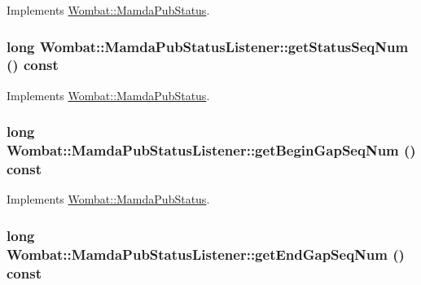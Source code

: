 Implements \hyperlink{classWombat_1_1MamdaPubStatus_553635179dab937c8ee88019f66ca0de}{Wombat::Mamda\-Pub\-Status}.\hypertarget{classWombat_1_1MamdaPubStatusListener_a3125f864d901d9d788778238c50c370}{
\subsubsection[getStatusSeqNum]{\setlength{\rightskip}{0pt plus 5cm}long Wombat::Mamda\-Pub\-Status\-Listener::get\-Status\-Seq\-Num () const}}
\label{classWombat_1_1MamdaPubStatusListener_a3125f864d901d9d788778238c50c370}




Implements \hyperlink{classWombat_1_1MamdaPubStatus_d954ab6ff4df01d45ff44a616745e515}{Wombat::Mamda\-Pub\-Status}.\hypertarget{classWombat_1_1MamdaPubStatusListener_ce7c4b6ae1c1508087ae25b2a8e1d61e}{
\subsubsection[getBeginGapSeqNum]{\setlength{\rightskip}{0pt plus 5cm}long Wombat::Mamda\-Pub\-Status\-Listener::get\-Begin\-Gap\-Seq\-Num () const}}
\label{classWombat_1_1MamdaPubStatusListener_ce7c4b6ae1c1508087ae25b2a8e1d61e}




Implements \hyperlink{classWombat_1_1MamdaPubStatus_61827ba531d12dfb8de2e8713fd8f628}{Wombat::Mamda\-Pub\-Status}.\hypertarget{classWombat_1_1MamdaPubStatusListener_cb0a6dff2e7c85b4c299444c743f7b36}{
\subsubsection[getEndGapSeqNum]{\setlength{\rightskip}{0pt plus 5cm}long Wombat::Mamda\-Pub\-Status\-Listener::get\-End\-Gap\-Seq\-Num () const}}
\label{classWombat_1_1MamdaPubStatusListener_cb0a6dff2e7c85b4c299444c743f7b36}




